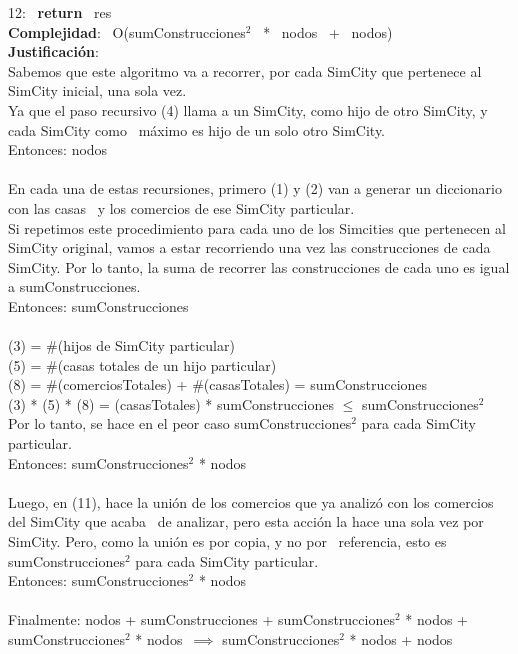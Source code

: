 \begin{Algoritmos}
    12: \ \textbf{return} \ res\\
    \textbf{Complejidad}: \ O(sumConstrucciones$^2$ \ * \ nodos \ + \ nodos)\\
    \textbf{Justificaci\'on}: \ \\
    Sabemos que este algoritmo va a recorrer, por cada SimCity que pertenece al SimCity inicial, una sola vez. \\
    Ya que el paso recursivo (4) llama a un SimCity, como hijo de otro SimCity, y cada SimCity como \
    máximo es hijo de un solo otro SimCity.\\
    Entonces: nodos\\
    \\
    En cada una de estas recursiones, primero (1) y (2) van a generar un diccionario con las casas \
    y los comercios de ese SimCity particular.\\
    Si repetimos este procedimiento para cada uno de los Simcities que pertenecen al SimCity original, 
    vamos a estar recorriendo una vez las construcciones de cada SimCity. Por lo tanto, la suma de recorrer 
    las construcciones de cada uno es igual a sumConstrucciones.\\
    Entonces: sumConstrucciones\\
    \\
    (3) = $ \# $(hijos de SimCity particular)\\
    (5) = $ \# $(casas totales de un hijo particular)\\
    (8) = $ \# $(comerciosTotales) + $ \# $(casasTotales) = sumConstrucciones\\
    (3) * (5) * (8) = (casasTotales) * sumConstrucciones $\leq$ sumConstrucciones$^2$\\
    Por lo tanto, se hace en el peor caso sumConstrucciones$^2$ para cada SimCity particular. \\
    Entonces: sumConstrucciones$^2$ * nodos\\
    \\
    Luego, en (11), hace la unión de los comercios que ya analizó con los comercios del SimCity que acaba \
    de analizar, pero esta acción la hace una sola vez por SimCity. Pero, como la unión es por copia, y no por \
    referencia, esto es sumConstrucciones$^2$ para cada SimCity particular.\\
    Entonces: sumConstrucciones$^2$ * nodos\\
    \\
    Finalmente: nodos + sumConstrucciones + sumConstrucciones$^2$ * nodos + sumConstrucciones$^2$ * nodos\ $\implies$ sumConstrucciones$^2$ * nodos + nodos\\

\end{Algoritmos}
